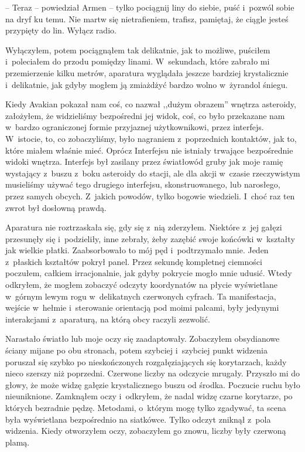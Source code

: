 \documentclass[oneside,polish,12pt,sfheadings]{mwbk}
\begin{document}
-- Teraz -- powiedział Armen -- tylko pociągnij liny do siebie, puść i~pozwól sobie na dryf ku temu. Nie martw się nietrafieniem, trafisz,
pamiętaj, że ciągle jesteś przypięty do lin. Wyłącz radio.

Wyłączyłem, potem pociągnąłem tak delikatnie, jak to możliwe, puściłem i~poleciałem do przodu pomiędzy linami. W~sekundach, które zabrało mi
przemierzenie kilku metrów, aparatura wyglądała jeszcze bardziej
krystalicznie i~delikatnie, jak gdyby mogłem ją zmiażdżyć bardzo wolno w~żyrandol śniegu.

Kiedy Avakian pokazał nam coś, co nazwał ,,dużym obrazem'' wnętrza
asteroidy, założyłem, że widzieliśmy bezpośredni jej widok, coś, co było
przekazane nam w~bardzo ograniczonej formie przyjaznej użytkownikowi,
przez interfejs. W~istocie, to, co zobaczyliśmy, było nagraniem z~poprzednich kontaktów, jak to, które miałem właśnie mieć. Oprócz
Interfejsu nie istniały trwające bezpośrednie widoki wnętrza. Interfejs
był zasilany przez światłowód gruby jak moje ramię wystający z~buszu z~boku asteroidy do stacji, ale dla akcji w~czasie rzeczywistym musieliśmy
używać tego drugiego interfejsu, skonstruowanego, lub narosłego, przez
samych obcych. Z~jakich powodów, tylko bogowie wiedzieli. I~choć raz ten
zwrot był dosłowną prawdą.

Aparatura nie roztrzaskała się, gdy się z~nią zderzyłem. Niektóre z~jej
gałęzi przesunęły się i~podzieliły, inne zebrały, żeby zazębić swoje
końcówki w~kształty jak wielkie płatki. Zaabsorbowało to mój pęd i~podtrzymało mnie. Jeden z~płaskich kształtów pokrył panel. Przez sekundę
kompletnej ciemności poczułem, całkiem irracjonalnie, jak gdyby pokrycie
mogło mnie udusić. Wtedy odkryłem, że mogłem zobaczyć odczyty
koordynatów na płycie wyświetlane w~górnym lewym rogu w~delikatnych
czerwonych cyfrach. Ta manifestacja, wejście w~hełmie i~sterowanie
orientacją pod moimi palcami, były jedynymi interakcjami z~aparaturą, na
którą obcy raczyli zezwolić.

Narastało światło lub moje oczy się zaadaptowały. Zobaczyłem obsydianowe
ściany mijane po obu stronach, potem szybciej i~szybciej punkt widzenia
poruszał się szybko po nieskończonych rozgałęziających się korytarzach,
każdy nieco szerszy niż poprzedni. Czerwone liczby na odczycie mrugały.
Przyszło mi do głowy, że może widzę gałęzie krystalicznego buszu od
środka. Poczucie ruchu było nieuniknione. Zamknąłem oczy i~odkryłem, że
nadal widzę czarne korytarze, po których bezradnie pędzę. Metodami, o~którym mogę tylko zgadywać, ta scena była wyświetlana bezpośrednio na
siatkówce. Tylko odczyt zniknął z~pola widzenia. Kiedy otworzyłem oczy,
zobaczyłem go znowu, liczby były czerwoną plamą.
\end{document}
